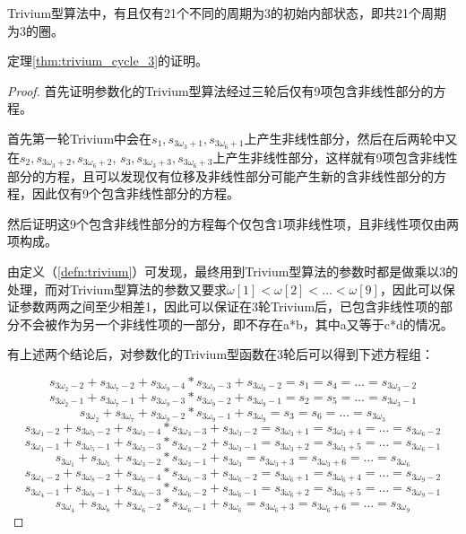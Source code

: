 \begin{thm}
\label{thm:trivium_cycle_3}
Trivium型算法中，有且仅有21个不同的周期为3的初始内部状态，即共21个周期为3的圈。

定理\ref{thm:trivium_cycle_3}的证明。
\begin{proof}
首先证明参数化的Trivium型算法经过三轮后仅有9项包含非线性部分的方程。

首先第一轮Trivium中会在$s_{1}, s_{3\omega_{3}+1}, s_{3\omega_{6}+1}$上产生非线性部分，然后在后两轮中又在$s_{2}, s_{3\omega_{3}+2}, s_{3\omega_{6}+2}$, $s_{3}, s_{3\omega_{3}+3}, s_{3\omega_{6}+3}$上产生非线性部分，这样就有9项包含非线性部分的方程，且可以发现仅有位移及非线性部分可能产生新的含非线性部分的方程，因此仅有9个包含非线性部分的方程。

然后证明这9个包含非线性部分的方程每个仅包含1项非线性项，且非线性项仅由两项构成。

由定义（\ref{defn:trivium}）可发现，最终用到Trivium型算法的参数时都是做乘以3的处理，而对Trivium型算法的参数又要求$\omega[1] < \omega[2] < \ldots < \omega[9]$，因此可以保证参数两两之间至少相差1，因此可以保证在3轮Trivium后，已包含非线性项的部分不会被作为另一个非线性项的一部分，即不存在a*b，其中a又等于c*d的情况。

有上述两个结论后，对参数化的Trivium型函数在3轮后可以得到下述方程组：

\[s_{3\omega_{2}-2}+s_{3\omega_{7}-2}+s_{3\omega_{9}-4}*s_{3\omega_{9}-3}+s_{3\omega_{9}-2}=s_{1}=s_{4}=\ldots=s_{3\omega_{3}-2}\]
\[s_{3\omega_{2}-1}+s_{3\omega_{7}-1}+s_{3\omega_{9}-3}*s_{3\omega_{9}-2}+s_{3\omega_{9}-1}=s_{2}=s_{5}=\ldots=s_{3\omega_{3}-1}\]
\[s_{3\omega_{2}}+s_{3\omega_{7}}+s_{3\omega_{9}-2}*s_{3\omega_{9}-1}+s_{3\omega_{9}}=s_{3}=s_{6}=\ldots=s_{3\omega_{3}}\]
\[s_{3\omega_{1}-2}+s_{3\omega_{5}-2}+s_{3\omega_{3}-4}*s_{3\omega_{3}-3}+s_{3\omega_{3}-2}=s_{3\omega_{3}+1}=s_{3\omega_{3}+4}=\ldots=s_{3\omega_{6}-2}\]
\[s_{3\omega_{1}-1}+s_{3\omega_{5}-1}+s_{3\omega_{3}-3}*s_{3\omega_{3}-2}+s_{3\omega_{3}-1}=s_{3\omega_{3}+2}=s_{3\omega_{3}+5}=\ldots=s_{3\omega_{6}-1}\]
\[s_{3\omega_{1}}+s_{3\omega_{5}}+s_{3\omega_{3}-2}*s_{3\omega_{3}-1}+s_{3\omega_{3}}=s_{3\omega_{3}+3}=s_{3\omega_{3}+6}=\ldots=s_{3\omega_{6}}\]
\[s_{3\omega_{4}-2}+s_{3\omega_{8}-2}+s_{3\omega_{6}-4}*s_{3\omega_{6}-3}+s_{3\omega_{6}-2}=s_{3\omega_{6}+1}=s_{3\omega_{6}+4}=\ldots=s_{3\omega_{9}-2}\]
\[s_{3\omega_{4}-1}+s_{3\omega_{8}-1}+s_{3\omega_{6}-3}*s_{3\omega_{6}-2}+s_{3\omega_{6}-1}=s_{3\omega_{6}+2}=s_{3\omega_{6}+5}=\ldots=s_{3\omega_{9}-1}\]
\[s_{3\omega_{4}}+s_{3\omega_{8}}+s_{3\omega_{6}-2}*s_{3\omega_{6}-1}+s_{3\omega_{6}}=s_{3\omega_{6}+3}=s_{3\omega_{6}+6}=\ldots=s_{3\omega_{9}}\]


\end{proof}
\end{thm}
